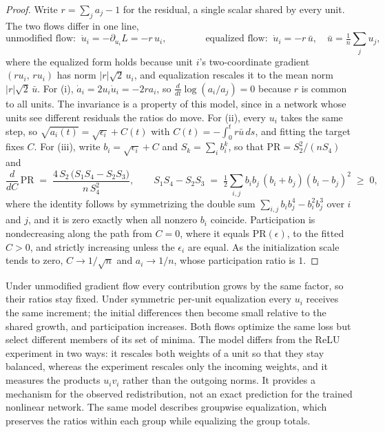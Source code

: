\documentclass{article} %
\begin{document}
\begin{proof}
Write $r = \sum_j a_j - 1$ for the residual, a single scalar shared by every unit. The two flows differ in one line,
\begin{equation}
\text{unmodified flow: }\ \dot{u}_i = -\partial_{u_i} L = -r\,u_i,
\qquad\qquad
\text{equalized flow: }\ \dot{u}_i = -r\,\bar{u},
\quad \bar{u} = \tfrac{1}{n}\textstyle\sum_j u_j,
\label{eq:twoflows}
\end{equation}
where the equalized form holds because unit $i$'s two-coordinate gradient $(r u_i,\, r u_i)$ has norm $|r|\sqrt{2}\,u_i$, and equalization rescales it to the mean norm $|r|\sqrt{2}\,\bar{u}$. For (i), $\dot{a}_i = 2 u_i \dot{u}_i = -2 r a_i$, so $\frac{d}{dt} \log(a_i / a_j) = 0$ because $r$ is common to all units. The invariance is a property of this model, since in a network whose units see different residuals the ratios do move. For (ii), every $u_i$ takes the same step, so $\sqrt{a_i(t)} = \sqrt{\epsilon_i} + C(t)$ with $C(t) = -\int_0^t r \bar{u}\, ds$, and fitting the target fixes $C$. For (iii), write $b_i = \sqrt{\epsilon_i} + C$ and $S_k = \sum_i b_i^k$, so that $\mathrm{PR} = S_2^2 / (n S_4)$ and
\begin{equation}
\frac{d}{dC}\,\mathrm{PR} \;=\; \frac{4\,S_2\,\big(S_1 S_4 - S_2 S_3\big)}{n\,S_4^{2}},
\qquad
S_1 S_4 - S_2 S_3 \;=\; \tfrac{1}{2}\sum_{i,j} b_i b_j\,(b_i + b_j)(b_i - b_j)^2 \;\geq\; 0,
\label{eq:prmono}
\end{equation}
where the identity follows by symmetrizing the double sum $\sum_{i,j} b_i b_j^4 - b_i^2 b_j^3$ over $i$ and $j$, and it is zero exactly when all nonzero $b_i$ coincide. Participation is nondecreasing along the path from $C = 0$, where it equals $\mathrm{PR}(\epsilon)$, to the fitted $C > 0$, and strictly increasing unless the $\epsilon_i$ are equal. As the initialization scale tends to zero, $C \to 1/\sqrt{n}$ and $a_i \to 1/n$, whose participation ratio is $1$.
\end{proof}

Under unmodified gradient flow every contribution grows by the same factor, so their ratios stay fixed. Under symmetric per-unit equalization every $u_i$ receives the same increment; the initial differences then become small relative to the shared growth, and participation increases. Both flows optimize the same loss but select different members of its set of minima. The model differs from the ReLU experiment in two ways: it rescales both weights of a unit so that they stay balanced, whereas the experiment rescales only the incoming weights, and it measures the products $u_i v_i$ rather than the outgoing norms. It provides a mechanism for the observed redistribution, not an exact prediction for the trained nonlinear network. The same model describes groupwise equalization, which preserves the ratios within each group while equalizing the group totals.
\end{document}
